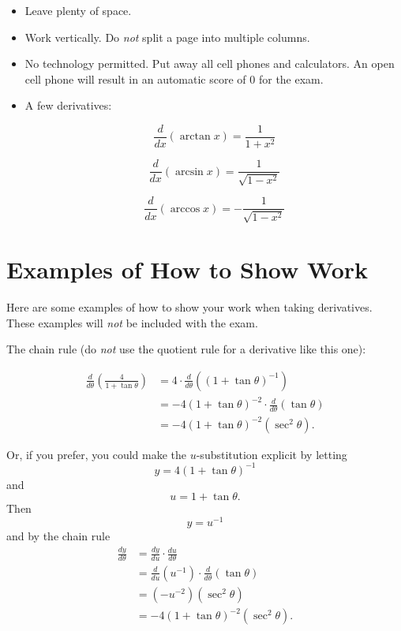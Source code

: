 \documentclass{ximera}
\begin{document}
\begin{itemize}
\item Leave plenty of space.  %

\item Work vertically. Do \emph{not} split a page into multiple columns.

\item No technology permitted. Put away all cell phones and calculators. An open cell phone will result in an automatic score of $0$ for the exam.

\item A few derivatives:

\[
 \frac{d}{dx}\left( \arctan x \right) = \frac{1}{1+x^2} 
\]

\[
 \frac{d}{dx}\left( \arcsin x \right) = \frac{1}{\sqrt{1-x^2}} 
\]

\[
 \frac{d}{dx}\left( \arccos x \right) = -\frac{1}{\sqrt{1-x^2}} 
\]

\end{itemize}

\section{Examples of How to Show Work}

Here are some examples of how to show your work when taking derivatives. These examples will \emph{not} be included with the exam.

\begin{example} \label{Ex:POPOPODDD}
The chain rule (do \emph{not} use the quotient rule for a derivative like this one):

\begin{align*}
 \frac{d}{d\theta} \left(  \frac{4}{1+\tan\theta}   \right) &= 4 \cdot\frac{d}{d\theta} \left( ({1+\tan\theta} )^{-1}  \right) \\
               &= -4 (1+\tan\theta)^{-2} \cdot \frac{d}{d\theta} \left( \tan\theta \right) \\
                &= -4 (1+\tan\theta)^{-2} (\sec^2\theta) .
\end{align*}

Or, if you prefer, you could make the $u$-substitution explicit by letting
\[
 y = 4(1+\tan\theta)^{-1}
\]
and 
\[
   u = 1+\tan\theta .
\]
Then
\[
 y = u^{-1}
\]
and by the chain rule
\begin{align*}
\frac{dy}{d\theta} &= \frac{dy}{du} \cdot \frac{du}{d\theta} \\
                           &= \frac{d}{du}(u^{-1})\cdot \frac{d}{d\theta}(\tan\theta)  \\
                           &= (-u^{-2})(\sec^2\theta) \\
                            &= -4 (1+\tan\theta)^{-2} (\sec^2\theta) .
    \end{align*}

\end{example}
\end{document}
